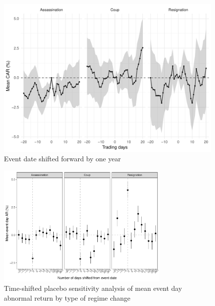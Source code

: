 \documentclass[12pt,final,fleqn]{article}
\theoremstyle{plain}
\begin{document}
\begin{figure}[!htb]
\centering
\includegraphics[max size={0.75\textwidth}]{../figs/mean-car-by-regime-change-type-placebo.pdf}
\caption{Event date shifted forward by one year} \label{subfig:mean-car-by-regime-change-placebo}
\end{figure}

\begin{figure}[!htb]
\centering
\includegraphics[width = 0.75\textwidth]{../figs/mean-ar-by-regime-change-type-placebo.pdf}
\caption{Time-shifted placebo sensitivity analysis of mean event day abnormal return by type of regime change}
\label{fig:mean-event-day-ar-by-regime-change}
\end{figure}
\end{document}
